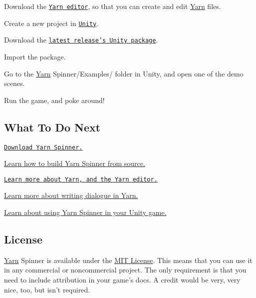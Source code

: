 \begin{DoxyEnumerate}
\item Download the \href{https://github.com/InfiniteAmmoInc/Yarn}{\tt Yarn editor}, so that you can create and edit \hyperlink{a00031}{Yarn} files.
\end{DoxyEnumerate}
\begin{DoxyEnumerate}
\item Create a new project in \href{https://unity3d.com/get-unity}{\tt Unity}.
\item Download the \href{https://github.com/thesecretlab/YarnSpinner/releases}{\tt latest release's Unity package}.
\item Import the package.
\item Go to the {\ttfamily \hyperlink{a00031}{Yarn} Spinner/\-Examples/} folder in Unity, and open one of the demo scenes.
\item Run the game, and poke around!
\end{DoxyEnumerate}

\subsection*{What To Do Next}


\begin{DoxyItemize}
\item \href{https://github.com/thesecretlab/YarnSpinner/releases}{\tt Download Yarn Spinner.}
\item \hyperlink{a00006}{Learn how to build Yarn Spinner from source.}
\item \href{https://github.com/infiniteammoinc/Yarn}{\tt Learn more about Yarn, and the Yarn editor.}
\item \hyperlink{a00014}{Learn more about writing dialogue in Yarn.}
\item \hyperlink{a00012}{Learn about using Yarn Spinner in your Unity game.}
\end{DoxyItemize}

\subsection*{License}

\hyperlink{a00031}{Yarn} Spinner is available under the \hyperlink{a00016}{M\-I\-T License}. This means that you can use it in any commercial or noncommercial project. The only requirement is that you need to include attribution in your game's docs. A credit would be very, very nice, too, but isn't required.


